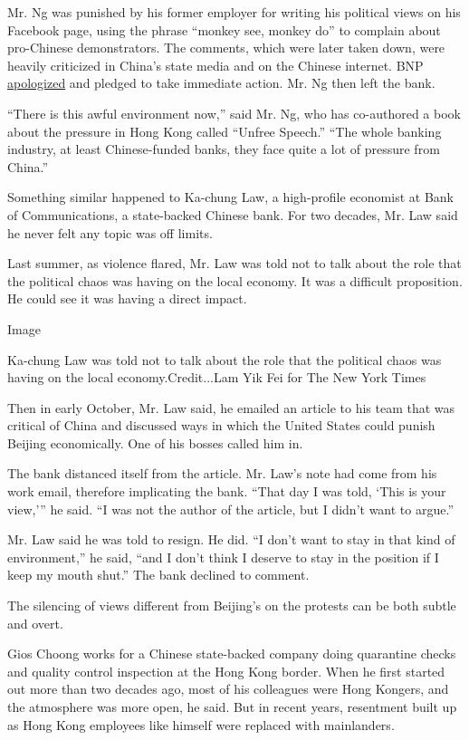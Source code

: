 Mr. Ng was punished by his former employer for writing his political
views on his Facebook page, using the phrase ``monkey see, monkey do''
to complain about pro-Chinese demonstrators. The comments, which were
later taken down, were heavily criticized in China's state media and on
the Chinese internet. BNP
\href{https://www.bnpparibas.com.hk/en/2019/09/13/statement-from-bnp-paribas-regarding-incident-involving-our-employee/}{apologized}
and pledged to take immediate action. Mr. Ng then left the bank.

``There is this awful environment now,'' said Mr. Ng, who has
co-authored a book about the pressure in Hong Kong called ``Unfree
Speech.'' ``The whole banking industry, at least Chinese-funded banks,
they face quite a lot of pressure from China.''

Something similar happened to Ka-chung Law, a high-profile economist at
Bank of Communications, a state-backed Chinese bank. For two decades,
Mr. Law said he never felt any topic was off limits.

Last summer, as violence flared, Mr. Law was told not to talk about the
role that the political chaos was having on the local economy. It was a
difficult proposition. He could see it was having a direct impact.

Image

Ka-chung Law was told not to talk about the role that the political
chaos was having on the local economy.Credit...Lam Yik Fei for The New
York Times

Then in early October, Mr. Law said, he emailed an article to his team
that was critical of China and discussed ways in which the United States
could punish Beijing economically. One of his bosses called him in.

The bank distanced itself from the article. Mr. Law's note had come from
his work email, therefore implicating the bank. ``That day I was told,
`This is your view,''' he said. ``I was not the author of the article,
but I didn't want to argue.''

Mr. Law said he was told to resign. He did. ``I don't want to stay in
that kind of environment,'' he said, ``and I don't think I deserve to
stay in the position if I keep my mouth shut.'' The bank declined to
comment.

The silencing of views different from Beijing's on the protests can be
both subtle and overt.

Gios Choong works for a Chinese state-backed company doing quarantine
checks and quality control inspection at the Hong Kong border. When he
first started out more than two decades ago, most of his colleagues were
Hong Kongers, and the atmosphere was more open, he said. But in recent
years, resentment built up as Hong Kong employees like himself were
replaced with mainlanders.


